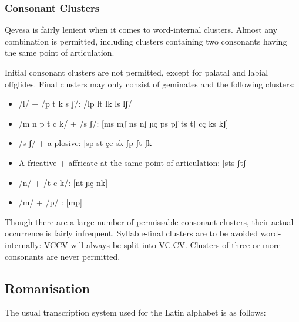 \documentclass[grammar]{subfiles}
\begin{document}
\subsubsection{Consonant Clusters}
\label{sssec:consonant_clusters}

Qevesa is fairly lenient when it comes to word-internal clusters.  Almost any
combination is permitted, including clusters containing two consonants having
the same point of articulation. 

Initial consonant clusters are not permitted, except for palatal and labial
offglides.  Final clusters may only consist of geminates and the following
clusters: 

\begin{itemize}
  \item /l/ + /p t k s ʃ/: /lp lt lk ls lʃ/
  \item /m n p t c k/ + /s ʃ/: [ms mʃ ns nʃ ɲç ps pʃ ts tʃ cç ks kʃ]
  \item /s ʃ/ + a plosive: [sp st çc sk ʃp ʃt ʃk]
  \item A fricative + affricate at the same point of articulation: [sts ʃtʃ]
  \item /n/ + /t c k/: [nt ɲç nk]
  \item /m/ + /p/ : [mp]
\end{itemize}

Though there are a large number of permissable consonant clusters, their actual
occurrence is fairly infrequent.  Syllable-final clusters are to be avoided
word-internally: VCCV will always be split into VC.CV\@.  Clusters of three or
more consonants are never permitted.


\subsection{Romanisation}
\label{ssec:romanisation}

The usual transcription system used for the Latin alphabet is as follows:
\end{document}
